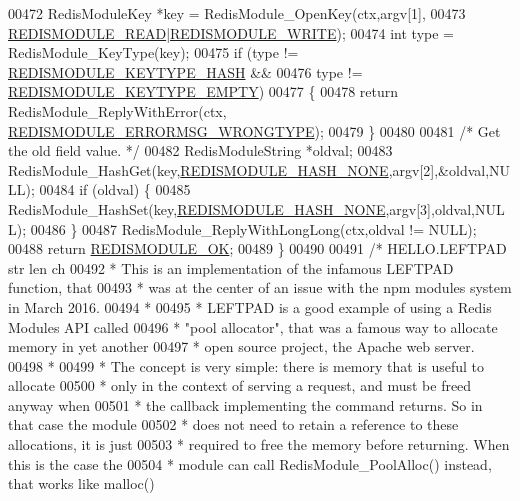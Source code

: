 \begin{DoxyCode}
00472     RedisModuleKey *key = RedisModule\_OpenKey(ctx,argv[1],
00473         \hyperlink{redismodule_8h_a369d2ff4bca768b05f826a12dd694825}{REDISMODULE\_READ}|\hyperlink{redismodule_8h_a73b37117ef94cb4a904361afcc51b6b4}{REDISMODULE\_WRITE});
00474     \textcolor{keywordtype}{int} type = RedisModule\_KeyType(key);
00475     \textcolor{keywordflow}{if} (type != \hyperlink{redismodule_8h_ac019575ac57520c325597e2fb54c5b71}{REDISMODULE\_KEYTYPE\_HASH} &&
00476         type != \hyperlink{redismodule_8h_adf2819748eb5e89c621d2c9c65c0b5f7}{REDISMODULE\_KEYTYPE\_EMPTY})
00477     \{
00478         \textcolor{keywordflow}{return} RedisModule\_ReplyWithError(ctx,
      \hyperlink{redismodule_8h_ab897689b0673a1e4cbc097cb5bce04c1}{REDISMODULE\_ERRORMSG\_WRONGTYPE});
00479     \}
00480 
00481     \textcolor{comment}{/* Get the old field value. */}
00482     RedisModuleString *oldval;
00483     RedisModule\_HashGet(key,\hyperlink{redismodule_8h_a991da3f59f9c0261d449957f71e2dbf8}{REDISMODULE\_HASH\_NONE},argv[2],&oldval,NULL);
00484     \textcolor{keywordflow}{if} (oldval) \{
00485         RedisModule\_HashSet(key,\hyperlink{redismodule_8h_a991da3f59f9c0261d449957f71e2dbf8}{REDISMODULE\_HASH\_NONE},argv[3],oldval,NULL);
00486     \}
00487     RedisModule\_ReplyWithLongLong(ctx,oldval != NULL);
00488     \textcolor{keywordflow}{return} \hyperlink{redismodule_8h_a1bc5bfd69abcd378ff52c640adc5418d}{REDISMODULE\_OK};
00489 \}
00490 
00491 \textcolor{comment}{/* HELLO.LEFTPAD str len ch}
00492 \textcolor{comment}{ * This is an implementation of the infamous LEFTPAD function, that}
00493 \textcolor{comment}{ * was at the center of an issue with the npm modules system in March 2016.}
00494 \textcolor{comment}{ *}
00495 \textcolor{comment}{ * LEFTPAD is a good example of using a Redis Modules API called}
00496 \textcolor{comment}{ * "pool allocator", that was a famous way to allocate memory in yet another}
00497 \textcolor{comment}{ * open source project, the Apache web server.}
00498 \textcolor{comment}{ *}
00499 \textcolor{comment}{ * The concept is very simple: there is memory that is useful to allocate}
00500 \textcolor{comment}{ * only in the context of serving a request, and must be freed anyway when}
00501 \textcolor{comment}{ * the callback implementing the command returns. So in that case the module}
00502 \textcolor{comment}{ * does not need to retain a reference to these allocations, it is just}
00503 \textcolor{comment}{ * required to free the memory before returning. When this is the case the}
00504 \textcolor{comment}{ * module can call RedisModule\_PoolAlloc() instead, that works like malloc()}

\end{DoxyCode}
